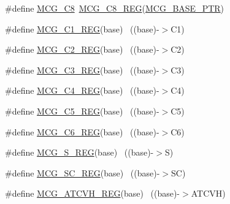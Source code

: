 \begin{DoxyCompactItemize}
\item 
\#define \hyperlink{group___m_c_g___register___accessor___macros_ga4328cf0c21c1c85cc0d618f7762016b8}{M\+C\+G\+\_\+\+C8}~\hyperlink{group___m_c_g___register___accessor___macros_gabd2e261bd5f2bddbbed7e076eaf90dee}{M\+C\+G\+\_\+\+C8\+\_\+\+R\+EG}(\hyperlink{group___m_c_g___peripheral_gaceefc72e93a47a35f59a31c57dddf41b}{M\+C\+G\+\_\+\+B\+A\+S\+E\+\_\+\+P\+TR})
\item 
\#define \hyperlink{group___m_c_g___register___accessor___macros_gae34b03d76caea16a8366fb11838560ea}{M\+C\+G\+\_\+\+C1\+\_\+\+R\+EG}(base)                                              ~((base)-\/$>$C1)
\item 
\#define \hyperlink{group___m_c_g___register___accessor___macros_ga81f0c07fe9169d8b0d87c8dc497b4732}{M\+C\+G\+\_\+\+C2\+\_\+\+R\+EG}(base)                                              ~((base)-\/$>$C2)
\item 
\#define \hyperlink{group___m_c_g___register___accessor___macros_ga0a47f442b7ba0665e9536b8d187c2f92}{M\+C\+G\+\_\+\+C3\+\_\+\+R\+EG}(base)                                              ~((base)-\/$>$C3)
\item 
\#define \hyperlink{group___m_c_g___register___accessor___macros_ga8b1f5173fccdea7dfd4e2ea46db8002f}{M\+C\+G\+\_\+\+C4\+\_\+\+R\+EG}(base)                                              ~((base)-\/$>$C4)
\item 
\#define \hyperlink{group___m_c_g___register___accessor___macros_gaf5c35c53a6183c707c255e7a9aeaca49}{M\+C\+G\+\_\+\+C5\+\_\+\+R\+EG}(base)                                              ~((base)-\/$>$C5)
\item 
\#define \hyperlink{group___m_c_g___register___accessor___macros_gadbc313b8733938cb5efd4ffa9050d84b}{M\+C\+G\+\_\+\+C6\+\_\+\+R\+EG}(base)                                              ~((base)-\/$>$C6)
\item 
\#define \hyperlink{group___m_c_g___register___accessor___macros_ga69f3bd6d5a19734d5e76e9948464eb7b}{M\+C\+G\+\_\+\+S\+\_\+\+R\+EG}(base)                                                ~((base)-\/$>$S)
\item 
\#define \hyperlink{group___m_c_g___register___accessor___macros_ga5ac33230f450775fe7f50243d3c6daaf}{M\+C\+G\+\_\+\+S\+C\+\_\+\+R\+EG}(base)                                              ~((base)-\/$>$SC)
\item 
\#define \hyperlink{group___m_c_g___register___accessor___macros_gad874adcb4ac61be011c975d1e0441273}{M\+C\+G\+\_\+\+A\+T\+C\+V\+H\+\_\+\+R\+EG}(base)                                        ~((base)-\/$>$A\+T\+C\+VH)

\end{DoxyCompactItemize}
